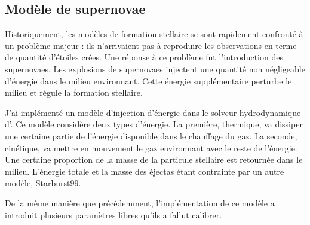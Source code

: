 \subsection*{Mod\`ele de supernovae}

Historiquement, les modèles de formation stellaire se sont rapidement confronté à un problème majeur : ils n'arrivaient pas à reproduire les observations en terme de quantité d'étoiles crées.
Une réponse à ce problème fut l'introduction des supernovaes. 
Les explosions de supernovaes injectent une quantité non négligeable d'énergie dans le milieu environnant.
Cette énergie supplémentaire perturbe le milieu et régule la formation stellaire.

J'ai implémenté un modèle d'injection d'énergie dans le solveur hydrodynamique d'\emma.
Ce modèle considère deux types d'énergie. 
La première, thermique, va dissiper une certaine partie de l'énergie disponible dans le chauffage du gaz.
La seconde, cinétique, va mettre en mouvement le gaz environnant avec le reste de l'énergie.
Une certaine proportion de la masse de la particule stellaire est retournée dans le milieu. 
L'énergie totale et la masse des éjectas étant contrainte par un autre modèle, Starburst99.

De la même manière que précédemment, l'implémentation de ce modèle a introduit plusieurs paramètres libres qu'ils a fallut calibrer.




